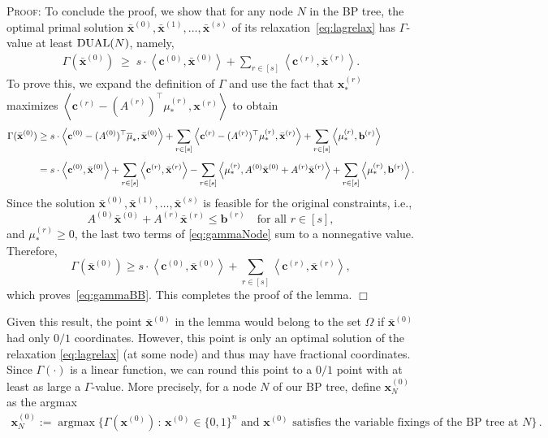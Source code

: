 \documentclass{article}
\DeclareMathOperator{\argmax}{\operatorname{argmax}}
\newcommand{\cv}[0]{\mathbf{c}}
\newcommand{\xv}[0]{\mathbf{x}}
\newcommand{\bv}[0]{\mathbf{b}}
\newenvironment{proof}[1][]
   {\textsc{Proof#1: }}
   {\hfill$\Box$\smallskip}
\newcommand{\iprod}[2]{\left\langle {#1}, {#2} \right\rangle}
\newcommand{\LAG}{\textup{DUAL}}
\begin{document}
\begin{proof}
To conclude the proof, we show that for any node $N$ in the BP tree, the optimal
primal solution
$\bar{\xv}^{(0)}, \bar{\xv}^{(1)}, \ldots, \bar{\xv}^{(s)}$
of its relaxation~\eqref{eq:lagrelax} has $\Gamma$-value at least $\LAG(N)$, namely,
\begin{align}
\Gamma(\bar{\xv}^{(0)})
\;\ge\;
s \cdot \iprod{\cv^{(0)}}{\bar{\xv}^{(0)}}
+ \sum_{r \in [s]} \iprod{\cv^{(r)}}{\bar{\xv}^{(r)}} .
\label{eq:gammaBB}
\end{align}
To prove this, we expand the definition of $\Gamma$ and use the
fact that $\xv_*^{(r)}$ maximizes
$\iprod{\cv^{(r)} - (A^{(r)})^{\top} \mu_*^{(r)}}{\xv^{(r)}}$ to obtain
\begin{align}
\Gamma(\bar{\xv}^{(0)})
&\ge
s \cdot \iprod{\cv^{(0)} - (A^{(0)})^{\top} \overline{\mu}_*}{\bar{\xv}^{(0)}}
+ \sum_{r \in [s]} \iprod{\cv^{(r)} - (A^{(r)})^{\top} \mu_*^{(r)}}{\bar{\xv}^{(r)}}
+ \sum_{r \in [s]} \iprod{\mu_*^{(r)}}{\bv^{(r)}} \notag\\[4pt]
&=
s \cdot \iprod{\cv^{(0)}}{\bar{\xv}^{(0)}}
+ \sum_{r \in [s]} \iprod{\cv^{(r)}}{\bar{\xv}^{(r)}}
- \sum_{r \in [s]} \iprod{\mu_*^{(r)}}{A^{(0)} \bar{\xv}^{(0)} + A^{(r)} \bar{\xv}^{(r)}}
+ \sum_{r \in [s]} \iprod{\mu_*^{(r)}}{\bv^{(r)}}. \label{eq:gammaNode}
\end{align}
Since the solution
$\bar{\xv}^{(0)}, \bar{\xv}^{(1)}, \ldots, \bar{\xv}^{(s)}$
is feasible for the original constraints, i.e.,
\[
A^{(0)} \bar{\xv}^{(0)} + A^{(r)} \bar{\xv}^{(r)} \le \bv^{(r)}
\quad \text{for all } r \in [s],
\]
and $\mu_*^{(r)} \ge 0$, the last two terms of \eqref{eq:gammaNode} sum to a nonnegative value. Therefore,
\[
\Gamma(\bar{\xv}^{(0)})
\ge
s \cdot \iprod{\cv^{(0)}}{\bar{\xv}^{(0)}}
+ \sum_{r \in [s]} \iprod{\cv^{(r)}}{\bar{\xv}^{(r)}},
\]
which proves~\eqref{eq:gammaBB}. This completes the proof of the lemma.
\end{proof}

Given this result, the point $\bar{\xv}^{(0)}$ in the lemma would belong to the set $\Omega$ if $\bar{\xv}^{(0)}$ had only $0/1$ coordinates. However, this point is only an optimal solution of the relaxation \eqref{eq:lagrelax} (at some node) and thus may have fractional coordinates. Since $\Gamma(\cdot)$ is a linear function, we can round this point to a $0/1$ point with at least as large a $\Gamma$-value. More precisely, for a node $N$ of our BP tree, define $\xv^{(0)}_N$ as the argmax
\begin{align*}
   \xv^{(0)}_N := \argmax\Big\{ \Gamma(\xv^{(0)}) \,:\, \xv^{(0)} \in \{0,1\}^n \textrm{ and $\xv^{(0)}$ satisfies the variable fixings of the BP tree at $N$} \Big\}\,.
\end{align*}
\end{document}
